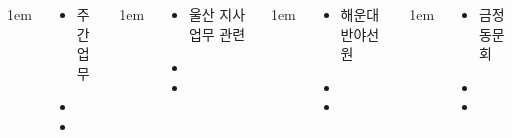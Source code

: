 \documentclass[	20pt, 
							a0paper, 
							landscape,
							margin=0mm, %
							innermargin=10mm,  		%
							blockverticalspace=4mm, %
							colspace=5mm, 
							subcolspace=0mm
							]{tikzposter}
\begin{document}
\begin{columns}

			{
					\setlength{\leftmargini}{4em}
					\setlength{\labelsep} {1em}
				\begin{LARGE}
					\begin{itemize}
					\item 주간업무
					\item 
					\item 
					\end{itemize}
				\end{LARGE}
			} %


			{
					\setlength{\leftmargini}{4em}
					\setlength{\labelsep} {1em}
				\begin{LARGE}
					\begin{itemize}
					\item 울산 지사 업무 관련
					\item 
					\item 
					\end{itemize}
				\end{LARGE}
			} %




			{
					\setlength{\leftmargini}{4em}
					\setlength{\labelsep} {1em}
				\begin{LARGE}
					\begin{itemize}
					\item 해운대 반야선원
					\item 
					\item 
					\end{itemize}
				\end{LARGE}
			} %


			{
					\setlength{\leftmargini}{4em}
					\setlength{\labelsep} {1em}
				\begin{LARGE}
					\begin{itemize}
					\item 금정 동문회
					\item 
					\item 
					\end{itemize}
				\end{LARGE}
			} %





\end{columns}
\end{document}
